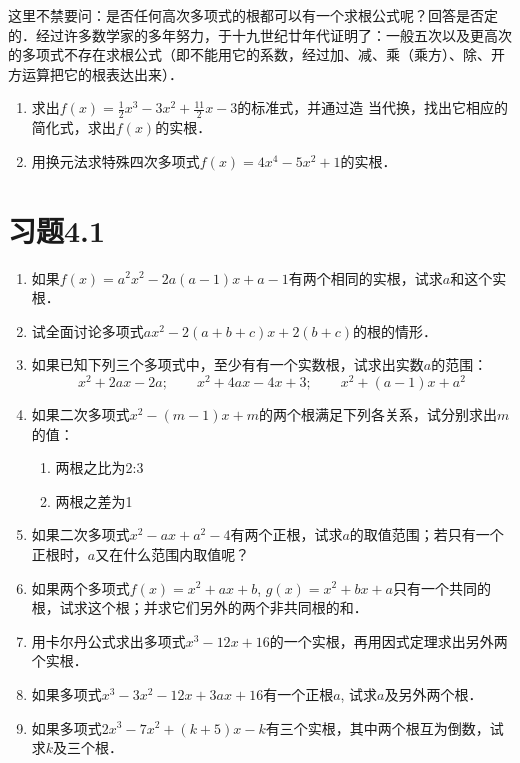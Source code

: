 这里不禁要问：是否任何高次多项式的根都可以有一个求根公式呢？回答是否定的．经过许多数学家的多年努力，于十九世纪廿年代证明了：一般五次以及更高次的多项式不存在求根公式（即不能用它的系数，经过加、减、乘（乘方）、除、开方运算把它的根表达出来）．

\begin{ex}
\begin{enumerate}
    \item 求出$f(x)=\frac{1}{2}x^3-3x^2+\frac{11}{2}x-3$的标准式，并通过造
当代换，找出它相应的简化式，求出$f(x)$的实根．
\item 用换元法求特殊四次多项式$f(x)=4x^4-5x^2+1$的实根．
\end{enumerate}
\end{ex}

\section*{习题4.1}
\begin{enumerate}
    \item 如果$f(x)=a^2x^2-2a(a-1)x+a-1$有两个相同的实根，试求$a$和这个实根．
    \item 试全面讨论多项式$ax^2-2(a+b+c)x+2(b+c)$的根的情形．
    \item 如果已知下列三个多项式中，至少有有一个实数根，试求出实数$a$的范围：
\[x^2+2ax-2a;\qquad x^2+4ax-4x+3;\qquad x^2+(a-1)x+a^2\]
\item 如果二次多项式$x^2-(m-1)x+m$的两个根满足下列各关系，试分别求出$m$的值：
\begin{multicols}{2}
    \begin{enumerate}
        \item 两根之比为2:3
        \item 两根之差为1
    \end{enumerate}
\end{multicols}

\item 如果二次多项式$x^2-ax+a^2-4$有两个正根，试求$a$的取值范围；若只有一个正根时，$a$又在什么范围内取值呢？
\item 如果两个多项式$f(x)=x^2+ax+b$, $g(x)=x^2+bx+a$只有一个共同的根，试求这个根；并求它们另外的两个非共同根的和．
\item 用卡尔丹公式求出多项式$x^3-12x+16$的一个实根，再用因式定理求出另外两个实根．
\item 如果多项式$x^3-3x^2-12x+3ax+16$有一个正根$a$, 试求$a$及另外两个根．
\item 如果多项式$2x^3-7x^2+(k+5)x-k$有三个实根，其中两个根互为倒数，试求$k$及三个根．
\end{enumerate}

